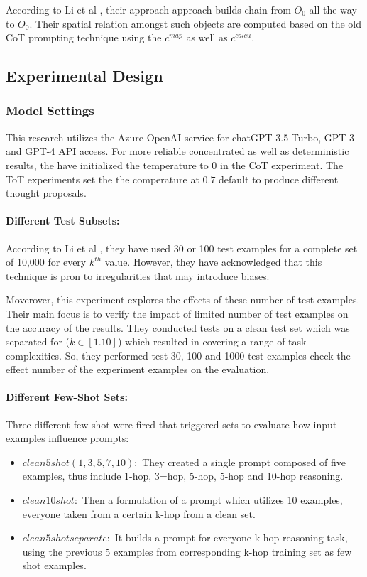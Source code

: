 \documentclass{article}
\begin{document}
According to Li et al \cite{li2024}, their approach approach builds chain from $O_{0}$ all the way to $O_{0}$. Their spatial relation amongst such objects are computed based on the old CoT prompting technique using the $c^{map}$ as well as $c^{calcu}$.

\subsection{Experimental Design}


\subsubsection{Model Settings}

This research utilizes the Azure OpenAI service for chatGPT-3.5-Turbo, GPT-3 and GPT-4 API access. For more reliable concentrated as well as deterministic results, the have initialized the temperature to 0 in the CoT experiment. The ToT experiments set the the comperature at $0.7$ default to produce different thought proposals.
\paragraph{Different Test Subsets:}  According to Li et al \cite{li2024}, they have used 30 or 100 test examples for a complete set of 10,000 for every $k^{th}$ value. However, they have acknowledged that this technique is pron to irregularities that may introduce biases.

Moverover, this experiment explores the effects of these number of test examples. Their main focus is to verify the impact of limited number of test examples on the accuracy of the results. They conducted tests on a clean test set which was separated for ($k \in [1.10]$) which resulted in covering a range of task complexities. So, they performed test 30, 100 and 1000 test examples check the effect number of the experiment examples on the evaluation.

\paragraph{Different Few-Shot Sets:} Three different few shot were fired that triggered sets to evaluate how input examples influence prompts:

\begin{itemize}
    \item   $clean 5shot(1,3,5,7,10):$ They created a single prompt composed of five examples, thus include 1-hop, 3=hop, 5-hop, 5-hop and 10-hop reasoning.
    \item   $clean 10shot:$ Then a formulation of a prompt which utilizes 10 examples, everyone taken from a certain k-hop from a clean set.
    \item   $clean 5shot separate:$ It builds a prompt for everyone k-hop reasoning task, using the previous 5 examples from corresponding k-hop training set as few shot examples.
\end{itemize}
\end{document}
